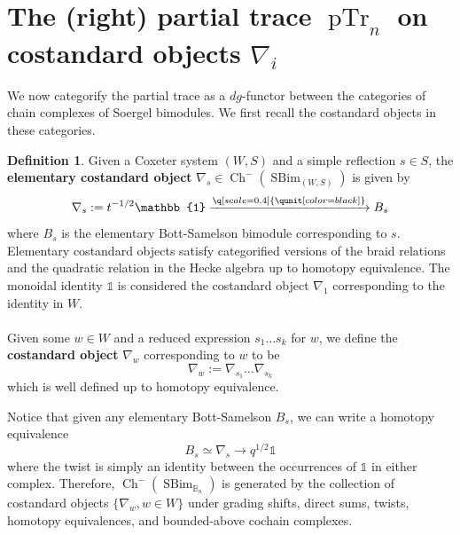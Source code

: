 \documentclass[11pt]{article}
\DeclareMathOperator{\Ch}{Ch}
\DeclareMathOperator{\SBim}{SBim}
\DeclareMathOperator{\pTr}{pTr}
\theoremstyle{definition}
\newtheorem{definition}{Definition}[section]
\theoremstyle{remark}
\numberwithin{equation}{section}
\begin{document}
\section{The (right) partial trace $\pTr_{n}$ on costandard objects $\nabla_i$}
We now categorify the partial trace as a $dg$-functor between the categories
of chain complexes of Soergel bimodules. We first recall the costandard objects
in these categories.
\begin{definition}
Given a Coxeter system $(W,S)$ and a simple reflection $s\in S$, the
\textbf{elementary costandard object} $\nabla_s\in
\Ch^-(\SBim_{(W,S)})$ is given by
\[
\nabla_s:=
t^{-1/2}\mathbb{1} \xrightarrow{\q[scale=0.4]{\qunit[color=black]}} B_s\]
where $B_{s}$ is the elementary Bott-Samelson bimodule corresponding to
$s$. Elementary costandard objects satisfy categorified versions of the braid
relations and the quadratic relation in the Hecke algebra up to homotopy equivalence.
The monoidal identity $\mathbb{1}$ is considered the costandard object $\nabla_1$
corresponding to the identity in $W$.
\\ \\
Given some $w\in W$ and a reduced expression $s_1\dots s_k$ for $w$, we define
the \textbf{costandard object} $\nabla_w$ corresponding to $w$ to be
\[\nabla_w:=\nabla_{s_1}\dots \nabla_{s_k}\]
which is well defined up to homotopy equivalence. 
\end{definition}
\noindent
Notice that given any elementary Bott-Samelson $B_s$, we can write a homotopy
equivalence
\[B_s\simeq \nabla_s \to q^{1/2}\mathbb{1}\]
where the twist is simply an identity between the occurrences of
$\mathbb{1}$ in either complex. Therefore, $\Ch^-(\SBim_{\mathbb{B}_{n}})$ is generated
by the collection of costandard objects
$\{\nabla_w,w\in W\}$ under grading shifts, direct sums, twists,
homotopy equivalences, and bounded-above cochain complexes.
\end{document}
